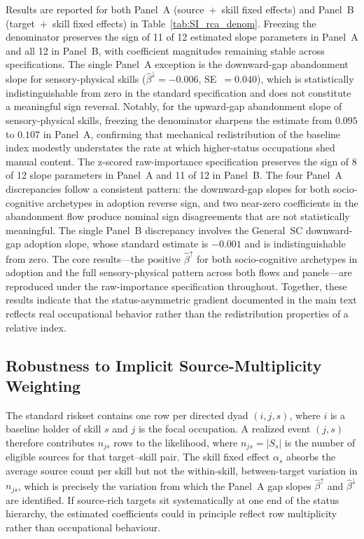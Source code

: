 \documentclass[11pt, letterpaper]{article} %
\begin{document}
Results are reported for both Panel~A (source~$+$~skill fixed effects) and Panel~B (target~$+$~skill fixed effects) in Table~\ref{tab:SI_rca_denom}. Freezing the denominator preserves the sign of 11 of 12 estimated slope parameters in Panel~A and all 12 in Panel~B, with coefficient magnitudes remaining stable across specifications. The single Panel~A exception is the downward-gap abandonment slope for sensory-physical skills ($\hat{\beta}^{\downarrow} = -0.006$, SE~$= 0.040$), which is statistically indistinguishable from zero in the standard specification and does not constitute a meaningful sign reversal. Notably, for the upward-gap abandonment slope of sensory-physical skills, freezing the denominator sharpens the estimate from $0.095$ to $0.107$ in Panel~A, confirming that mechanical redistribution of the baseline index modestly understates the rate at which higher-status occupations shed manual content. The z-scored raw-importance specification preserves the sign of 8 of 12 slope parameters in Panel~A and 11 of 12 in Panel~B. The four Panel~A discrepancies follow a consistent pattern: the downward-gap slopes for both socio-cognitive archetypes in adoption reverse sign, and two near-zero coefficients in the abandonment flow produce nominal sign disagreements that are not statistically meaningful. The single Panel~B discrepancy involves the General~SC downward-gap adoption slope, whose standard estimate is $-0.001$ and is indistinguishable from zero. The core results---the positive $\hat{\beta}^{\uparrow}$ for both socio-cognitive archetypes in adoption and the full sensory-physical pattern across both flows and panels---are reproduced under the raw-importance specification throughout. Together, these results indicate that the status-asymmetric gradient documented in the main text reflects real occupational behavior rather than the redistribution properties of a relative index.



\subsection{Robustness to Implicit Source-Multiplicity Weighting}
\label{sec:SI_weighting}

The standard riskset contains one row per directed dyad $(i, j, s)$, where $i$ is a baseline holder of skill $s$ and $j$ is the focal occupation. A realized event $(j, s)$ therefore contributes $n_{js}$ rows to the likelihood, where $n_{js} = |S_s|$ is the number of eligible sources for that target--skill pair. The skill fixed effect $\alpha_s$ absorbs the average source count per skill but not the within-skill, between-target variation in $n_{js}$, which is precisely the variation from which the Panel~A gap slopes $\hat{\beta}^{\uparrow}$ and $\hat{\beta}^{\downarrow}$ are identified. If source-rich targets sit systematically at one end of the status hierarchy, the estimated coefficients could in principle reflect row multiplicity rather than occupational behaviour.
\end{document}
